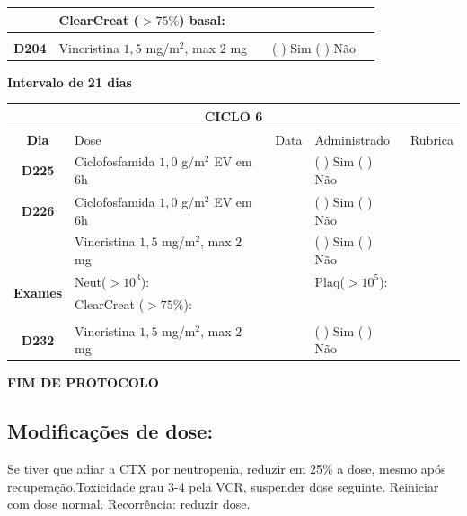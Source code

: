\documentclass[11pt,a4paper,oldfontcommands]{memoir}
\begin{document}
\begin{center}
\begin{table}[H]
\begin{tabular}{p{1cm}p{6cm}|p{1cm}|p{3cm}|p{2.5cm}}
    \cline{2-5}
    \multicolumn{1}{c|}{\multirow{2}{*}{{}}}&\multicolumn{2}{l|}{ClearCreat (\(>75\%\)) basal:}&{}&{}\\
    \hline
    \\
    \hline
    \multicolumn{1}{c|}{\multirow{1}{*}{\textbf{D204}}}&{Vincristina \(1,5\) mg/m\(^2\), max \(2\) mg}&&{(  ) Sim (  ) Não}&\\
    \hline
\end{tabular}
\end{table}
\textbf{Intervalo de 21 dias}
\begin{table}[H]
\begin{tabular}{p{1cm}p{6cm}|p{1cm}|p{3cm}|p{2.5cm}}
    \hline
	\multicolumn{5}{c}{\textbf{CICLO 6}}\\
	\hline
    \multicolumn{1}{c|}{\multirow{1}{*}{\textbf{Dia}}}&{Dose}&{Data}&{Administrado}&{Rubrica} \\
    \hline
    \multicolumn{1}{c|}{\multirow{1}{*}{\textbf{D225}}}&{Ciclofosfamida \(1,0\) g/m\(^2\) EV em 6h}&&{(  ) Sim (  ) Não}&\\
    \multicolumn{1}{c|}{\multirow{1}{*}{\textbf{D226}}}&{Ciclofosfamida \(1,0\) g/m\(^2\) EV em 6h}&&{(  ) Sim (  ) Não}&\\
    \multicolumn{1}{c|}{\multirow{1}{*}{\textbf{}}}&{Vincristina \(1,5\) mg/m\(^2\), max \(2\) mg}&&{(  ) Sim (  ) Não}&\\
    \hline
    \multicolumn{1}{c|}{\multirow{2}{*}{\textbf{Exames}}}&\multicolumn{2}{l|}{Neut(\(>10^3\)):}&{Plaq(\(>10^5\)):}&\\
    \cline{2-5}
    \multicolumn{1}{c|}{\multirow{2}{*}{{}}}&\multicolumn{2}{l|}{ClearCreat (\(>75\%\)):}&{}&{}\\
    \hline
    \\
    \hline
    \multicolumn{1}{c|}{\multirow{1}{*}{\textbf{D232}}}&{Vincristina \(1,5\) mg/m\(^2\), max \(2\) mg}&&{(  ) Sim (  ) Não}&\\
    \hline
\end{tabular}
\end{table}
\textbf{FIM DE PROTOCOLO}

\end{center}
\subsection{Modificações de dose:}
Se tiver que adiar a CTX por neutropenia, reduzir em 25\% a dose, mesmo após recuperação.Toxicidade grau 3-4 pela VCR, suspender dose seguinte. Reiniciar com dose normal. Recorrência: reduzir dose.
\end{document}
